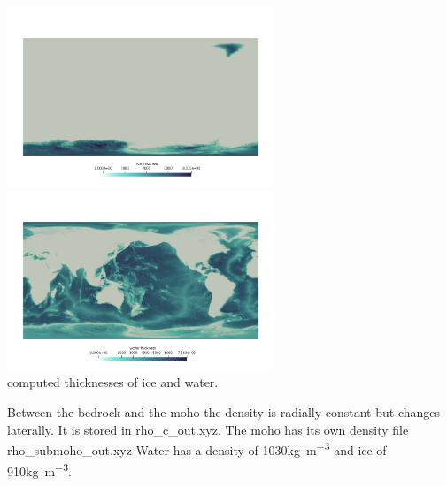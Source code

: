 \begin{center}
\includegraphics[width=8cm]{python_codes/fieldstone_99/images/ice_thickness}
\includegraphics[width=8cm]{python_codes/fieldstone_99/images/water_thickness}\\
{\captionfont computed thicknesses of ice and water.}
\end{center}

Between the bedrock and the moho the density is radially constant but changes 
laterally. It is stored in {\asciifile rho\_c\_out.xyz}.
The moho has its own density file {\asciifile rho\_submoho\_out.xyz}
Water has a density of 1030\si{\kg\per\cubic\metre} and ice of 910\si{\kg\per\cubic\metre}.

